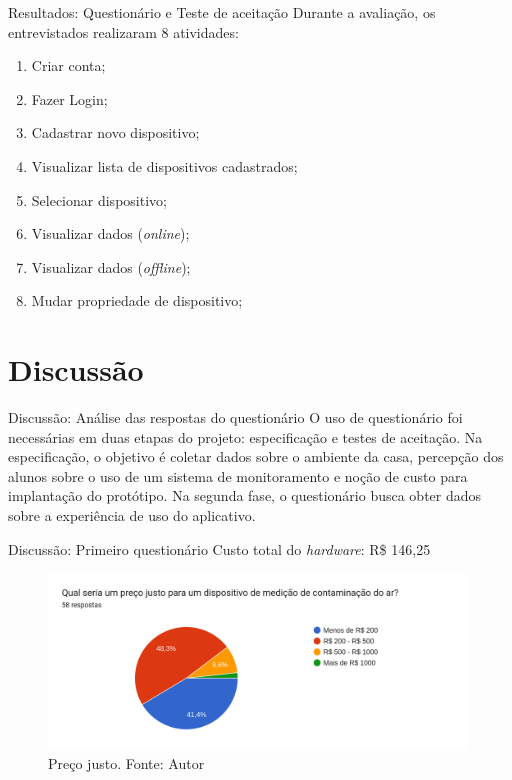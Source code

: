 \documentclass[12pt]{beamer}
\begin{document}
    \begin{frame}{Resultados: Questionário e Teste de aceitação}
        Durante a avaliação, os entrevistados realizaram 8 atividades:
        \begin{enumerate}
            \item Criar conta;
            \item Fazer Login;
            \item Cadastrar novo dispositivo;
            \item Visualizar lista de dispositivos cadastrados;
            \item Selecionar dispositivo;
            \item Visualizar dados (\textit{online});
            \item Visualizar dados (\textit{offline});
            \item Mudar propriedade de dispositivo;
        \end{enumerate}
    \end{frame}

    \section{Discussão}

    \begin{frame}{Discussão: Análise das respostas do questionário}
        O uso de questionário foi necessárias em duas etapas do projeto: especificação e testes 
        de aceitação. Na especificação, o objetivo é coletar dados sobre o ambiente da casa, percepção dos 
        alunos sobre o uso de um sistema de monitoramento e noção de custo para implantação do protótipo.
        Na segunda fase, o questionário busca obter dados sobre a experiência de uso do aplicativo.
    \end{frame}

    \begin{frame}{Discussão: Primeiro questionário}   
        Custo total do \textit{hardware}: R\$ 146,25
        
        \begin{figure}[ht]
            \centering
            \includegraphics[width=0.99\textwidth]{./img/grafico-preco-hardware.png}
            \caption{Preço justo. Fonte: Autor}\label{fig:precoJusto}
        \end{figure}
    \end{frame}
\end{document}

